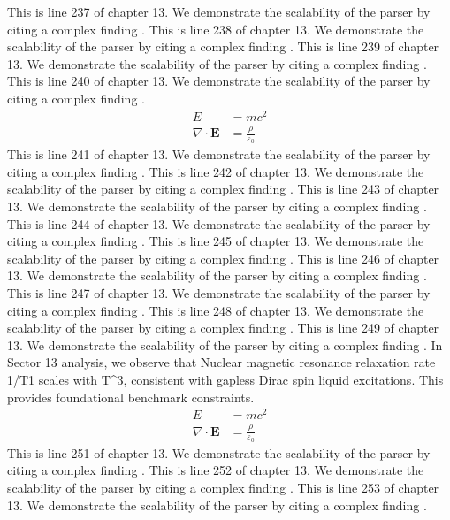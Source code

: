 This is line 237 of chapter 13. We demonstrate the scalability of the parser by citing a complex finding \cite{ref13_237}.
This is line 238 of chapter 13. We demonstrate the scalability of the parser by citing a complex finding \cite{ref13_238}.
This is line 239 of chapter 13. We demonstrate the scalability of the parser by citing a complex finding \cite{ref13_239}.
This is line 240 of chapter 13. We demonstrate the scalability of the parser by citing a complex finding \cite{ref13_240}.
\begin{align*}
  E &= mc^2 \\
  \nabla \cdot \mathbf{E} &= \frac{\rho}{\varepsilon_0}
\end{align*}
This is line 241 of chapter 13. We demonstrate the scalability of the parser by citing a complex finding \cite{ref13_241}.
This is line 242 of chapter 13. We demonstrate the scalability of the parser by citing a complex finding \cite{ref13_242}.
This is line 243 of chapter 13. We demonstrate the scalability of the parser by citing a complex finding \cite{ref13_243}.
This is line 244 of chapter 13. We demonstrate the scalability of the parser by citing a complex finding \cite{ref13_244}.
This is line 245 of chapter 13. We demonstrate the scalability of the parser by citing a complex finding \cite{ref13_245}.
This is line 246 of chapter 13. We demonstrate the scalability of the parser by citing a complex finding \cite{ref13_246}.
This is line 247 of chapter 13. We demonstrate the scalability of the parser by citing a complex finding \cite{ref13_247}.
This is line 248 of chapter 13. We demonstrate the scalability of the parser by citing a complex finding \cite{ref13_248}.
This is line 249 of chapter 13. We demonstrate the scalability of the parser by citing a complex finding \cite{ref13_249}.
In Sector 13 analysis, we observe that Nuclear magnetic resonance relaxation rate 1/T1 scales with T^3, consistent with gapless Dirac spin liquid excitations. This provides foundational benchmark constraints.
\begin{align*}
  E &= mc^2 \\
  \nabla \cdot \mathbf{E} &= \frac{\rho}{\varepsilon_0}
\end{align*}
This is line 251 of chapter 13. We demonstrate the scalability of the parser by citing a complex finding \cite{ref13_251}.
This is line 252 of chapter 13. We demonstrate the scalability of the parser by citing a complex finding \cite{ref13_252}.
This is line 253 of chapter 13. We demonstrate the scalability of the parser by citing a complex finding \cite{ref13_253}.
